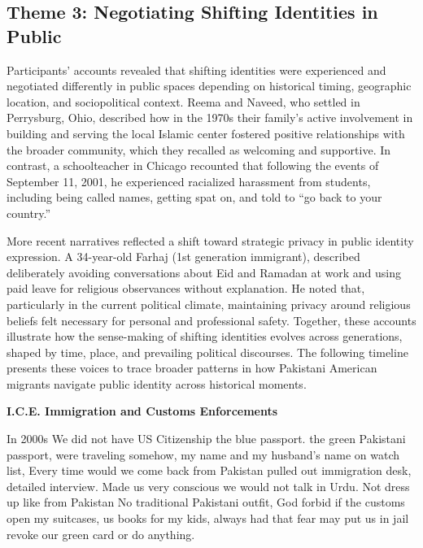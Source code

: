 \subsection{Theme 3: Negotiating Shifting Identities in Public}

Participants’ accounts revealed that shifting identities were experienced and negotiated differently in public spaces depending on historical timing, geographic location, and sociopolitical context. Reema and Naveed, who settled in Perrysburg, Ohio, described how in the 1970s their family’s active involvement in building and serving the local Islamic center fostered positive relationships with the broader community, which they recalled as welcoming and supportive. In contrast, a schoolteacher in Chicago recounted that following the events of September 11, 2001, he experienced racialized harassment from students, including being called names, getting spat on, and told to ``go back to your country.''

More recent narratives reflected a shift toward strategic privacy in public identity expression. A 34-year-old Farhaj (1st generation immigrant), described deliberately avoiding conversations about Eid and Ramadan at work and using paid leave for religious observances without explanation. He noted that, particularly in the current political climate, maintaining privacy around religious beliefs felt necessary for personal and professional safety. Together, these accounts illustrate how the sense-making of shifting identities evolves across generations, shaped by time, place, and prevailing political discourses. The following timeline presents these voices to trace broader patterns in how Pakistani American migrants navigate public identity across historical moments.

\textbf{I.C.E. Immigration and Customs Enforcements}

\begin{FoundPoem}
In 2000s 
We did not have 
                       US Citizenship 			the blue passport. 
the green Pakistani passport, 
 were traveling 		somehow,
 my name and my husband's name 			on watch list, 
Every time 	would we come back from Pakistan 
pulled 	 out 	 immigration desk,           	detailed interview. 
Made us	        	  very conscious 
we would not talk in Urdu. 
Not    dress up		 like           from Pakistan 
No traditional Pakistani outfit, 				 God forbid if the customs open my suitcases, 		
          us books for my kids,					always had that fear 
 may put us in jail 	 revoke our green card 
or do anything. 				 	 
\end{FoundPoem}

